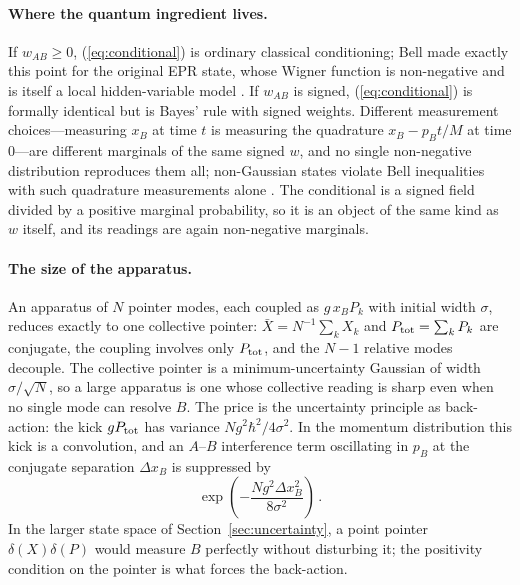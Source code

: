 \documentclass[12pt]{article}
\begin{document}
\paragraph{Where the quantum ingredient lives.}
If $w_{AB} \geq 0$, (\ref{eq:conditional}) is ordinary classical conditioning; Bell made exactly this point for the original EPR state, whose Wigner function is non-negative and is itself a local hidden-variable model \cite{bell1987}.
If $w_{AB}$ is signed, (\ref{eq:conditional}) is formally identical but is Bayes' rule with signed weights.
Different measurement choices---measuring $x_B$ at time $t$ is measuring the quadrature $x_B - p_B t/M$ at time $0$---are different marginals of the same signed $w$, and no single non-negative distribution reproduces them all; non-Gaussian states violate Bell inequalities with such quadrature measurements alone \cite{nha2004,garciapatron2004}.
The conditional is a signed field divided by a positive marginal probability, so it is an object of the same kind as $w$ itself, and its readings are again non-negative marginals.

\paragraph{The size of the apparatus.}
An apparatus of $N$ pointer modes, each coupled as $g\, x_B P_k$ with initial width $\sigma$, reduces exactly to one collective pointer: $\bar X = N^{-1}\sum_k X_k$ and $P_{\rm tot} = \sum_k P_k$ are conjugate, the coupling involves only $P_{\rm tot}$, and the $N-1$ relative modes decouple.
The collective pointer is a minimum-uncertainty Gaussian of width $\sigma/\sqrt{N}$, so a large apparatus is one whose collective reading is sharp even when no single mode can resolve $B$.
The price is the uncertainty principle as back-action: the kick $g P_{\rm tot}$ has variance $N g^2 \hbar^2/4\sigma^2$.
In the momentum distribution this kick is a convolution, and an $A$--$B$ interference term oscillating in $p_B$ at the conjugate separation $\Delta x_B$ is suppressed by
\begin{equation}\label{eq:decoherence}
\exp\!\left(-\frac{N g^2 \Delta x_B^2}{8\sigma^2}\right) \,.
\end{equation}
In the larger state space of Section~\ref{sec:uncertainty}, a point pointer $\delta(X)\delta(P)$ would measure $B$ perfectly without disturbing it; the positivity condition on the pointer is what forces the back-action.
\end{document}
